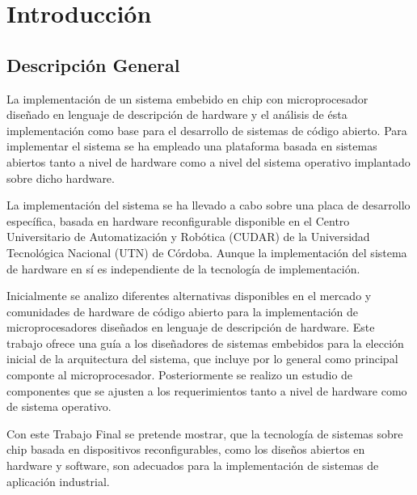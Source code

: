 \chapter{Introducción}

\section{Descripción General}

La implementación de un sistema embebido en chip con microprocesador diseñado en lenguaje de descripción de hardware y el análisis de ésta implementación como base para el desarrollo de sistemas de código abierto. Para implementar el sistema se ha empleado una plataforma basada en sistemas abiertos tanto a nivel de hardware como a nivel del sistema operativo implantado sobre dicho hardware.

La implementación del sistema se ha llevado a cabo sobre una placa de desarrollo específica, basada en hardware reconfigurable disponible en el
Centro Universitario de Automatización y Robótica (CUDAR) de la Universidad Tecnológica Nacional (UTN) de Córdoba. Aunque la implementación del
sistema de hardware en sí es independiente de la tecnología de implementación.

Inicialmente se analizo diferentes alternativas disponibles en el mercado y comunidades de hardware de código abierto para la
implementación de microprocesadores diseñados en lenguaje de descripción de hardware. Este trabajo ofrece una guía a los diseñadores de
sistemas embebidos para la elección inicial de la arquitectura del sistema, que incluye por lo general como principal componte al microprocesador. Posteriormente se realizo un estudio de componentes que se ajusten a los requerimientos tanto a nivel de hardware como de sistema operativo.

Con este Trabajo Final se pretende mostrar, que la tecnología de sistemas sobre chip basada en dispositivos reconfigurables, como los diseños abiertos en hardware y software, son adecuados para la implementación de sistemas de aplicación industrial.

